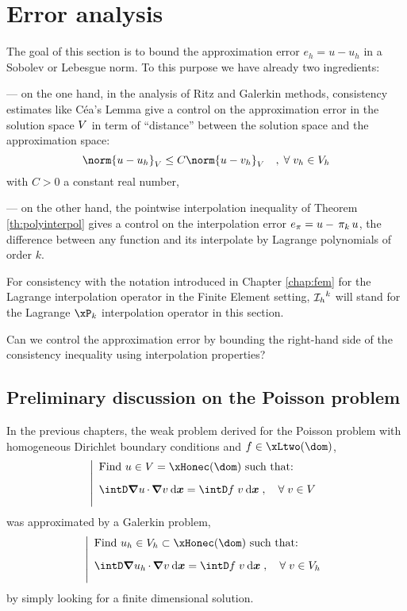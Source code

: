 
\chapter{Error analysis}\label{chap:ea}

The goal of this section is to bound the approximation error $e_h = u - u_h$ in a Sobolev or Lebesgue norm.
To this purpose we have already two ingredients:

--- on the one hand, in the analysis of Ritz and Galerkin methods, consistency estimates like Céa's Lemma give a control on the approximation error in the solution space ${V}$ in term of ``distance'' between the solution space and the approximation space:
\begin{equation*}
\norm{u - u_h}_\xV  \leq C \norm{u - v_h}_\xV\quad,\; \forany v_h \in \xVh
\end{equation*}
with $C > 0$ a constant real number,

--- on the other hand, the pointwise interpolation inequality of Theorem \eqref{th:polyinterpol} gives a control on the interpolation error $e_{\pi} = u - \,\mathrm{\pi}_{k}\, u$, \ie the difference between any function and its interpolate by Lagrange polynomials of order $k$.

\medskip
For consistency with the notation introduced in Chapter \ref{chap:fem} for the Lagrange interpolation operator in the Finite Element setting, $\mathop{\mathcal{I}_{h}}^k$ will stand for the Lagrange $\xP_k$ interpolation operator in this section.

\medskip
\Question Can we control the approximation error by bounding the right-hand side of the consistency inequality using interpolation properties?

\section{Preliminary discussion on the Poisson problem}

In the previous chapters, the weak problem derived for the Poisson problem with homogeneous Dirichlet boundary conditions and $f\in\xLtwo(\dom)$,
\begin{equation*}
\left\lvert
\begin{array}{ll}
\mbox{Find $u\in \xV = \xHonec(\dom)$ such that:}\\[2ex]
\displaystyle\intD \Grad{u}\xDot\Grad{v} \dxx = \intD f\;v \dxx\;,\quad\forany v \in\xV\\[2ex]
\end{array}
\right.
\end{equation*}
was approximated by a Galerkin problem,
\begin{equation*}
\left\lvert
\begin{array}{ll}
\mbox{Find $u_h\in\xVh\subset\xHonec(\dom)$ such that:}\\[2ex]
\displaystyle\intD \Grad{u_h}\xDot\Grad{v} \dxx = \intD f\;v \dxx\;,\quad\forany v \in\xVh\\[2ex]
\end{array}
\right.
\end{equation*}
by simply looking for a finite dimensional solution.


